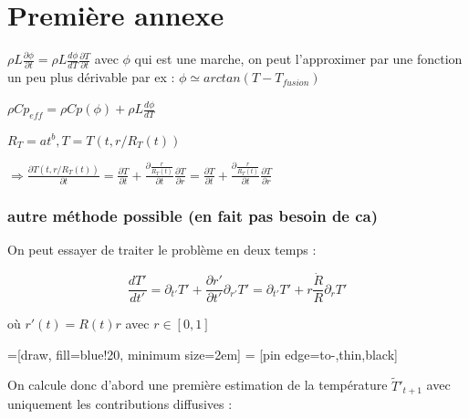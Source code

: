 \documentclass[10pt,a4paper]{article}
\numberwithin{equation}{section}
\begin{document}
\section{Première annexe} \label{annexe_fonctionnelles}
$ \rho L \frac{\partial \phi}{\partial t} = \rho L \frac{d \phi}{d T}\frac{\partial T}{\partial t} $ avec $\phi$ qui est une marche, on peut l'approximer par une fonction un peu plus dérivable par ex :  $\phi \simeq arctan(T-T_{fusion})$ 

$ \rho Cp_{eff} = \rho Cp(\phi) + \rho L  \frac{d \phi}{d T}$



$R_T = a t^b , T = T(t,r/R_T(t)) $

$\Rightarrow \frac{\partial T(t,r/R_T(t))}{\partial t}  = \frac{\partial T}{\partial t} + \frac{\partial \frac{r}{R_T(t)}}{\partial t}\frac{\partial T}{\partial r} = \frac{\partial T}{\partial t} + \frac{\partial \frac{r}{R_T(t)}}{\partial t}\frac{\partial T}{\partial r} $


\subsubsection{autre méthode possible (en fait pas besoin de ca)}


On peut essayer de traiter le problème en deux temps : 

\begin{equation}
\frac{ dT'}{dt'} = \partial_{t'} T' + \frac{\partial r'}{\partial t'} \partial_{r'} T' = \partial_{t'} T' + r \frac{\dot{R}}{R}\partial_{r} T'
\end{equation}

où $r'(t) = R(t)r$ avec $r \in [0,1]$

=[draw, fill=blue!20, minimum size=2em]
 = [pin edge={to-,thin,black}]


On calcule donc d'abord une première estimation de la température $\tilde{T}'_{t+1}$ avec uniquement les contributions diffusives :
\end{document}
